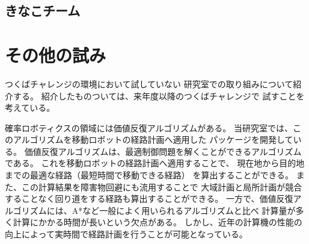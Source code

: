 \documentclass[twocolumn,9pt]{jsproceedings}
\begin{document}
\subsection{きなこチーム}





\section{その他の試み}

つくばチャレンジの環境において試していない
研究室での取り組みについて紹介する。
紹介したものついては、来年度以降のつくばチャレンジで
試すことを考えている。

確率ロボティクスの領域には価値反復アルゴリズム\cite{上田詳解}がある。
当研究室では、このアルゴリズムを移動ロボットの経路計画へ適用した
パッケージを開発している\cite{ueda2023JRM}。
価値反復アルゴリズムは、最適制御問題を解くことができるアルゴリズムである。
これを移動ロボットの経路計画へ適用することで、
現在地から目的地までの最適な経路（最短時間で移動できる経路）
を算出することができる。
また、この計算結果を障害物回避にも流用することで
大域計画と局所計画が競合することなく回り道をする経路も算出することができる。
一方で、価値反復アルゴリズムには、A*など一般によく用いられるアルゴリズムと比べ
計算量が多く計算にかかる時間が長いという欠点がある。
しかし、近年の計算機の性能の向上によって実時間で経路計画を行うことが可能となっている。
\end{document}
